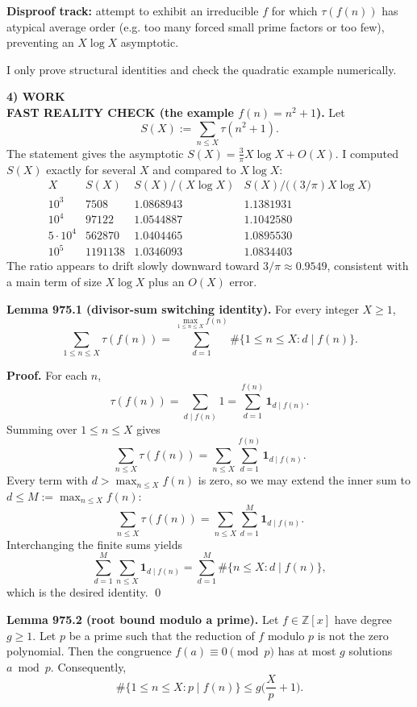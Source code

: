 \textbf{Disproof track:} attempt to exhibit an irreducible $f$ for which $\tau(f(n))$ has atypical average order (e.g. too many forced small prime factors or too few), preventing an $X\log X$ asymptotic.

I only prove structural identities and check the quadratic example numerically.

\medskip
\noindent\textbf{4) WORK}\\
\textbf{FAST REALITY CHECK (the example $f(n)=n^2+1$).}  Let
\[S(X):=\sum_{n\le X} \tau(n^2+1).
\]
The statement gives the asymptotic $S(X)=\frac{3}{\pi}X\log X+O(X)$.
I computed $S(X)$ exactly for several $X$ and compared to $X\log X$:
\[
\begin{array}{c|c|c|c}
X & S(X) & S(X)/(X\log X) & S(X)/\big((3/\pi)X\log X\big)\\\hline
 10^3 & 7508 & 1.0868943 & 1.1381931\\
 10^4 & 97122 & 1.0544887 & 1.1042580\\
 5\cdot 10^4 & 562870 & 1.0404465 & 1.0895530\\
 10^5 & 1191138 & 1.0346093 & 1.0834403
\end{array}
\]
The ratio appears to drift slowly downward toward $3/\pi\approx 0.9549$, consistent with a main term of size $X\log X$ plus an $O(X)$ error.

\medskip
\noindent\textbf{Lemma 975.1 (divisor-sum switching identity).}\label{lem:975-divswitch}
For every integer $X\ge 1$,
\[
\sum_{1\le n\le X} \tau(f(n))
=\sum_{d=1}^{\max_{1\le n\le X} f(n)} \#\{1\le n\le X: d\mid f(n)\}.
\]

\noindent\textbf{Proof.}
For each $n$,
\[
\tau(f(n))=\sum_{d\mid f(n)} 1 = \sum_{d=1}^{f(n)} \mathbf{1}_{d\mid f(n)}.
\]
Summing over $1\le n\le X$ gives
\[
\sum_{n\le X}\tau(f(n)) = \sum_{n\le X}\sum_{d=1}^{f(n)} \mathbf{1}_{d\mid f(n)}.
\]
Every term with $d>\max_{n\le X} f(n)$ is zero, so we may extend the inner sum to $d\le M:=\max_{n\le X} f(n)$:
\[
\sum_{n\le X}\tau(f(n)) = \sum_{n\le X}\sum_{d=1}^{M} \mathbf{1}_{d\mid f(n)}.
\]
Interchanging the finite sums yields
\[
\sum_{d=1}^{M} \sum_{n\le X} \mathbf{1}_{d\mid f(n)} = \sum_{d=1}^{M} \#\{n\le X: d\mid f(n)\},
\]
which is the desired identity. \qed

\medskip
\noindent\textbf{Lemma 975.2 (root bound modulo a prime).}\label{lem:975-rootsmodp}
Let $f\in\mathbb{Z}[x]$ have degree $g\ge 1$.
Let $p$ be a prime such that the reduction of $f$ modulo $p$ is not the zero polynomial.
Then the congruence $f(a)\equiv 0\pmod p$ has at most $g$ solutions $a\bmod p$.
Consequently,
\[
\#\{1\le n\le X: p\mid f(n)\}\le g\Big(\frac{X}{p}+1\Big).
\]

